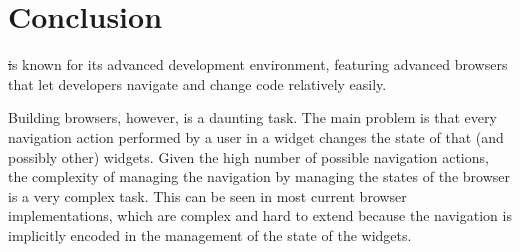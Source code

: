 \documentclass[a4paper,10pt,twoside]{book}
\begin{document}



\section{Conclusion} 



\st is known for its advanced development environment, featuring advanced browsers that let developers navigate and change code relatively easily.


Building browsers, however, is a daunting task. The main problem is that every navigation action performed by a user in a widget changes the state of that (and possibly other) widgets. Given the high number of possible navigation actions, the complexity of managing the navigation by managing the states of the browser is a very complex task.
This can be seen in most current browser implementations, which are complex and hard to extend because the navigation is implicitly encoded in the management of the state of the widgets.
 
\end{document}
